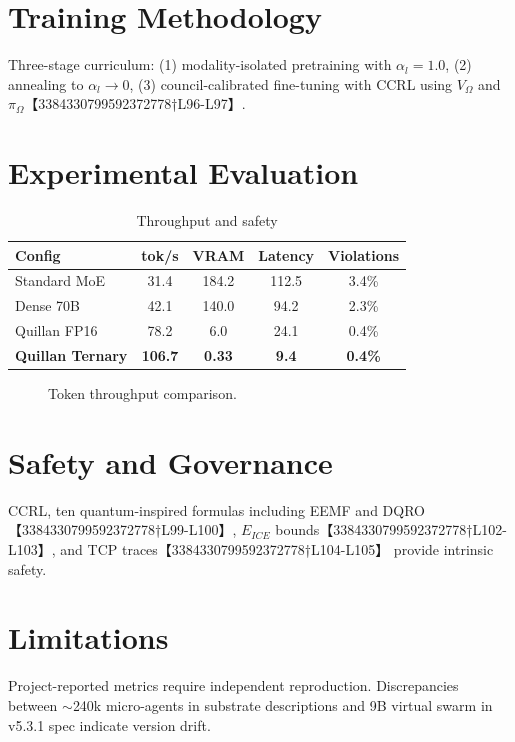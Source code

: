 \documentclass[11pt,a4paper,twocolumn]{article}
\begin{document}
\section{Training Methodology}
Three-stage curriculum: (1) modality-isolated pretraining with $\alpha_l=1.0$, (2) annealing to $\alpha_l\to0$, (3) council-calibrated fine-tuning with CCRL using $V_{\Omega}$ and $\pi_{\Omega}$【3384330799592372778†L96-L97】.

\section{Experimental Evaluation}
\begin{table}[htbp]
\centering
\caption{Throughput and safety}
\begin{tabular}{lcccc}
\toprule
Config & tok/s & VRAM & Latency & Violations \\
\midrule
Standard MoE & 31.4 & 184.2 & 112.5 & 3.4\% \\
Dense 70B & 42.1 & 140.0 & 94.2 & 2.3\% \\
Quillan FP16 & 78.2 & 6.0 & 24.1 & 0.4\% \\
\textbf{Quillan Ternary} & \textbf{106.7} & \textbf{0.33} & \textbf{9.4} & \textbf{0.4\%} \\
\bottomrule
\end{tabular}
\end{table}

\begin{figure}[htbp]
\centering
{}
\caption{Token throughput comparison.}
\end{figure}

\section{Safety and Governance}
CCRL, ten quantum-inspired formulas including EEMF and DQRO【3384330799592372778†L99-L100】, $E_{ICE}$ bounds【3384330799592372778†L102-L103】, and TCP traces【3384330799592372778†L104-L105】 provide intrinsic safety.

\section{Limitations}
Project-reported metrics require independent reproduction. Discrepancies between $\sim$240k micro-agents in substrate descriptions and 9B virtual swarm in v5.3.1 spec indicate version drift.
\end{document}
